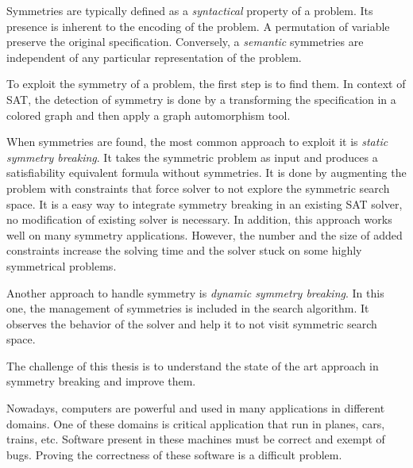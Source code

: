 Symmetries are typically defined as a \textit{syntactical} property of a problem. 
Its presence is inherent to the encoding of the problem.
A permutation of variable preserve the original specification. 
Conversely, a \textit{semantic} symmetries are independent of any 
particular representation of the problem.


To exploit the symmetry of a problem, the first step is to find them.
In context of SAT, the detection of symmetry is done by a transforming the specification
in a colored graph and then apply a graph automorphism tool.



When symmetries are found, the most common approach to exploit it is \emph{static symmetry breaking}.
It takes the symmetric problem as input and produces a satisfiability equivalent formula without symmetries.
It is done by augmenting the problem with constraints that force solver to not explore the symmetric search 
space. It is a easy way to integrate symmetry breaking in an existing SAT solver, no modification 
of existing solver is necessary. In addition, this approach works well on many symmetry applications.
However, the number and the size of added constraints increase the solving time and the solver stuck
on some highly symmetrical problems.


Another approach to handle symmetry is \emph{dynamic symmetry breaking}. In this one, the management of
symmetries is included in the search algorithm. It observes the behavior of the solver and help it to
not visit symmetric search space.


The challenge of this thesis is to understand the state of  the art approach in symmetry breaking and
improve them.

%
%
%
%
%
%








Nowadays, computers are powerful and used in many applications in different domains.
One of these domains is critical application that run in planes, cars, trains, etc.
Software present in these machines must be correct and exempt of bugs.
Proving the correctness of these software is a difficult problem. 

